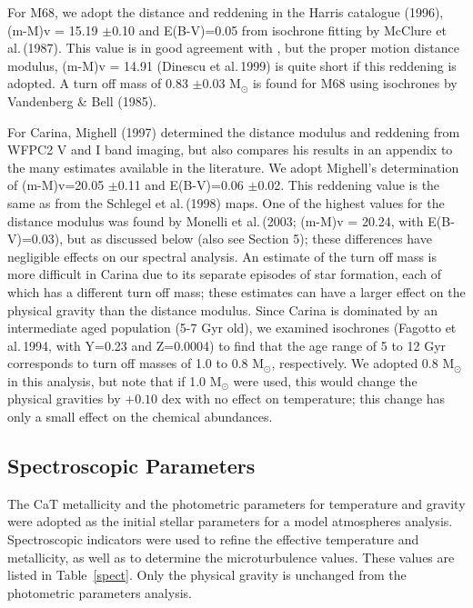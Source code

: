 \documentclass{emulateapj}
\newcommand\etal{{\rm et al.\,}}
\begin{document}
For M68, we adopt the distance and reddening in the Harris catalogue (1996), 
(m-M)v = 15.19 $\pm$0.10 and E(B-V)=0.05 
from isochrone fitting by McClure \etal (1987).  
This value is in good agreement with \citet{Broc97}, but the 
proper motion distance modulus, (m-M)v = 14.91 (Dinescu \etal 1999) 
is quite short if this reddening is adopted.
A turn off mass of 0.83 $\pm$0.03 M$_\odot$ is found for M68
using isochrones by Vandenberg \& Bell (1985). 

For Carina, Mighell (1997) determined the distance modulus and reddening
from WFPC2 V and I band imaging, but also compares his results in an
appendix to the many estimates available in the literature.   We adopt 
Mighell's determination of (m-M)v=20.05 $\pm$0.11 and E(B-V)=0.06 $\pm$0.02.   
This reddening value is the same as from the Schlegel \etal (1998) maps.
One of the highest values for the distance modulus was found by 
Monelli \etal (2003; (m-M)v = 20.24, with E(B-V)=0.03), but as discussed below
(also see Section 5); these differences have negligible effects 
on our spectral analysis. 
An estimate of the turn off mass is more difficult in Carina
due to its separate episodes of star formation, each of which has 
a different turn off mass; these estimates can have a larger effect 
on the physical gravity than the distance modulus.  
Since Carina is dominated by an intermediate aged population 
(5-7 Gyr old), we examined isochrones (Fagotto \etal 1994, 
with Y=0.23 and Z=0.0004) to find that the age range of 
5 to 12 Gyr corresponds to turn off masses of 1.0 to 0.8 M$_\odot$,
respectively.   
We adopted 0.8 M$_\odot$  in this analysis, but note that if 
1.0 M$_\odot$ were used, this would change the physical gravities 
by $+0.10$ dex with no effect on temperature; 
this change has only a small effect on the 
chemical abundances.



\subsection{Spectroscopic Parameters \label{analysis}}

The CaT metallicity and the photometric parameters for temperature 
and gravity were adopted as the initial stellar parameters for a model 
atmospheres analysis.   Spectroscopic indicators were used 
to refine the effective temperature and metallicity, as well as to 
determine the microturbulence values.   These values are listed in
Table~\ref{spect}.  Only the physical gravity is
unchanged from the photometric parameters analysis.
\end{document}
